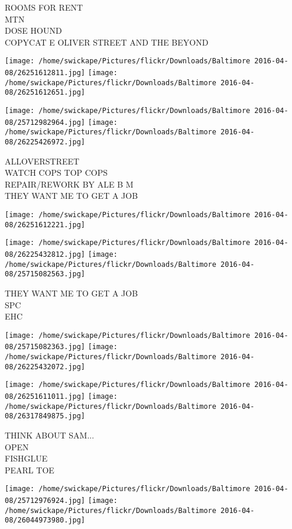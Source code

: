 \documentclass[10pt,letterpaper]{article}
\begin{document}
ROOMS FOR RENT\\
MTN\\
DOSE HOUND\\
COPYCAT E OLIVER STREET AND THE BEYOND
\pagebreak

\texttt{[image: /home/swickape/Pictures/flickr/Downloads/Baltimore 2016-04-08/26251612811.jpg]}
\texttt{[image: /home/swickape/Pictures/flickr/Downloads/Baltimore 2016-04-08/26251612651.jpg]}

\texttt{[image: /home/swickape/Pictures/flickr/Downloads/Baltimore 2016-04-08/25712982964.jpg]}
\texttt{[image: /home/swickape/Pictures/flickr/Downloads/Baltimore 2016-04-08/26225426972.jpg]}

ALLOVERSTREET\\
WATCH COPS TOP COPS\\
REPAIR/REWORK BY ALE B M\\
THEY WANT ME TO GET A JOB
\pagebreak

\texttt{[image: /home/swickape/Pictures/flickr/Downloads/Baltimore 2016-04-08/26251612221.jpg]}

\vspace{0.25in}
\texttt{[image: /home/swickape/Pictures/flickr/Downloads/Baltimore 2016-04-08/26225432812.jpg]}
\texttt{[image: /home/swickape/Pictures/flickr/Downloads/Baltimore 2016-04-08/25715082563.jpg]}

THEY WANT ME TO GET A JOB\\
SPC\\
EHC
\pagebreak

\texttt{[image: /home/swickape/Pictures/flickr/Downloads/Baltimore 2016-04-08/25715082363.jpg]}
\texttt{[image: /home/swickape/Pictures/flickr/Downloads/Baltimore 2016-04-08/26225432072.jpg]}

\texttt{[image: /home/swickape/Pictures/flickr/Downloads/Baltimore 2016-04-08/26251611011.jpg]}
\texttt{[image: /home/swickape/Pictures/flickr/Downloads/Baltimore 2016-04-08/26317849875.jpg]}

THINK ABOUT SAM...\\
OPEN\\
FISHGLUE\\
PEARL TOE
\pagebreak

\texttt{[image: /home/swickape/Pictures/flickr/Downloads/Baltimore 2016-04-08/25712976924.jpg]}
\texttt{[image: /home/swickape/Pictures/flickr/Downloads/Baltimore 2016-04-08/26044973980.jpg]}
\end{document}
